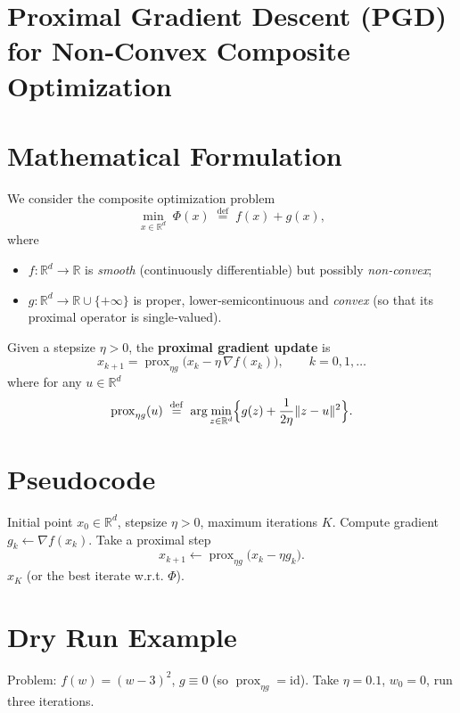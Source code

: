 \documentclass{article}
\newcommand{\prox}{\operatorname{prox}}
\newcommand{\grad}{\nabla}
\newcommand{\R}{\mathbb{R}}
\begin{document}
\section*{Proximal Gradient Descent (PGD) for Non‑Convex Composite Optimization}

\section*{Mathematical Formulation}
We consider the composite optimization problem
\[
\min_{x\in\R^{d}} \; \Phi(x)\;\stackrel{\mathrm{def}}{=}\; f(x)+g(x),
\]
where
\begin{itemize}
    \item $f:\R^{d}\to\R$ is \emph{smooth} (continuously differentiable) but possibly \emph{non‑convex};
    \item $g:\R^{d}\to\R\cup\{+\infty\}$ is proper, lower‑semicontinuous and \emph{convex} (so that its proximal operator is single‑valued).
\end{itemize}
Given a stepsize $\eta>0$, the \textbf{proximal gradient update} is
\begin{equation}
\label{eq:update}
x_{k+1}= \prox_{\eta g}\!\bigl(x_k-\eta \,\grad f(x_k)\bigr),
\qquad k=0,1,\dots
\end{equation}
where for any $u\in\R^{d}$
\[
\prox_{\eta g}(u)\;\stackrel{\mathrm{def}}{=}\;\arg\min_{z\in\R^{d}}\Bigl\{ g(z)+\frac{1}{2\eta}\|z-u\|^{2}\Bigr\}.
\]

\section*{Pseudocode}
\begin{algorithm}[H]
\caption{Proximal Gradient Descent (PGD)}
\begin{algorithmic}[1]
\REQUIRE Initial point $x_{0}\in\R^{d}$, stepsize $\eta>0$, maximum iterations $K$.
    \STATE Compute gradient $g_k \gets \grad f(x_k)$.
    \STATE Take a proximal step
    \[
    x_{k+1} \gets \prox_{\eta g}\bigl(x_k-\eta g_k\bigr).
    \]
\ENDFOR
\RETURN $x_{K}$ (or the best iterate w.r.t. $\Phi$).
\end{algorithmic}
\end{algorithm}

\section*{Dry Run Example}
Problem: $f(w)=(w-3)^{2}$, $g\equiv0$ (so $\prox_{\eta g}= \mathrm{id}$).  
Take $\eta=0.1$, $w_{0}=0$, run three iterations.
\end{document}
